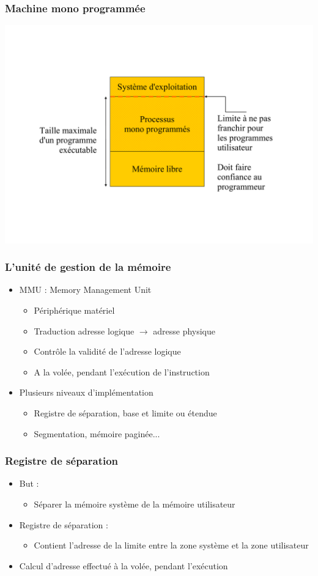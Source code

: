 \begin{frame}
\frametitle{Machine mono programmée}
\includegraphics[width=.9\textwidth]{../illustration/memoire_principale_monoprogramme.pdf}
\end{frame}


\begin{frame}
\frametitle{L'unité de gestion de la mémoire}
\begin{itemize}
\item MMU : Memory Management Unit
\begin{itemize}
\item Périphérique matériel
\item Traduction adresse logique $\rightarrow$ adresse physique
\item Contrôle la validité de l'adresse logique
\item A la volée, pendant l'exécution de l'instruction
\end{itemize}
\item Plusieurs niveaux d'implémentation
\begin{itemize}
\item Registre de séparation, base et limite ou étendue
\item Segmentation, mémoire paginée...
\end{itemize}
\end{itemize}
\end{frame}



\begin{frame}
\frametitle{Registre de séparation}
\begin{itemize}
\item But :
\begin{itemize}
\item Séparer la mémoire système de la mémoire utilisateur
\end{itemize}
\item Registre de séparation :
\begin{itemize}
\item Contient l'adresse de la limite entre la zone système et la zone utilisateur
\end{itemize}
\item Calcul d'adresse effectué à la volée, pendant l'exécution
\end{itemize}
\end{frame}

